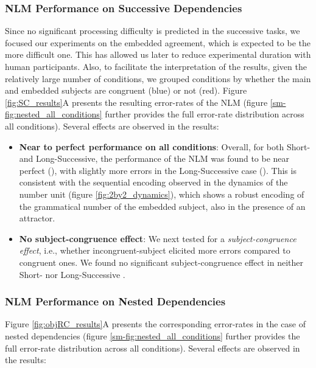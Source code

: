\subsubsection{NLM Performance on Successive Dependencies}
Since no significant processing difficulty is predicted in the successive tasks, we focused our experiments on the embedded agreement, which is expected to be the more difficult one. This has allowed us later to reduce experimental duration with human participants. Also, to facilitate the interpretation of the results, given the relatively large number of conditions, we grouped conditions by whether the main and embedded subjects are congruent (blue) or not (red). Figure \ref{fig:SC_results}A presents the resulting error-rates of the NLM (figure \ref{sm-fig:nested_all_conditions} further provides the full error-rate distribution across all conditions). Several effects are observed in the results: 

\begin{itemize}
    \item \textbf{Near to perfect performance on all conditions}: Overall, for both Short- and Long-Successive, the performance of the NLM was found to be near perfect (), with slightly more errors in the Long-Successive case (). This is consistent with the sequential encoding observed in the dynamics of the number unit (figure \ref{fig:2by2_dynamics}), which shows a robust encoding of the grammatical number of the embedded subject, also in the presence of an attractor.
    \item \textbf{No subject-congruence effect}: We next tested for a \textit{subject-congruence effect}, i.e., whether incongruent-subject elicited more errors compared to congruent ones. We found no significant subject-congruence effect in neither Short- nor Long-Successive .
\end{itemize}
 
\subsubsection{NLM Performance on Nested Dependencies}
Figure \ref{fig:objRC_results}A presents the corresponding error-rates in the case of nested dependencies (figure \ref{sm-fig:nested_all_conditions} further provides the full error-rate distribution across all conditions). Several effects are observed in the results:

